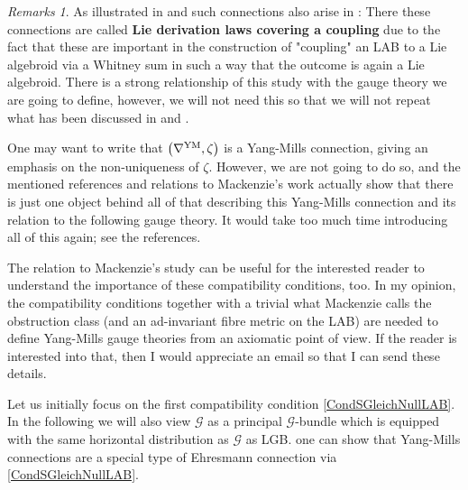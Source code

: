 \documentclass[a4paper,oneside,11pt,bibliography=totoc]{scrartcl}
\theoremstyle{plain}
\theoremstyle{remark}
\newtheorem{remark}[theorem]{Remarks}
\theoremstyle{definition}
\begin{document}
\begin{remark}\label{MackenziesStuffRelation}
\leavevmode\newline
As illustrated in \cite[\S 5.1]{MyThesis} and \cite{My1stpaper} such connections also arise in \cite[\S 7.2, page 271ff.]{mackenzieGeneralTheory}: There these connections are called \textbf{Lie derivation laws covering a coupling} due to the fact that these are important in the construction of "coupling" an LAB to a Lie algebroid via a Whitney sum in such a way that the outcome is again a Lie algebroid. There is a strong relationship of this study with the gauge theory we are going to define, however, we will not need this so that we will not repeat what has been discussed in \cite[\S 5.1]{MyThesis} and \cite{My1stpaper}. 

One may want to write that $\mleft( \nabla^{\mathrm{YM}}, \zeta \mright)$ is a Yang-Mills connection, giving an emphasis on the non-uniqueness of $\zeta$. However, we are not going to do so, and the mentioned references and relations to Mackenzie's work actually show that there is just one object behind all of that describing this Yang-Mills connection and its relation to the following gauge theory. It would take too much time introducing all of this again; see the references.

The relation to Mackenzie's study can be useful for the interested reader to understand the importance of these compatibility conditions, too. In my opinion, the compatibility conditions together with a trivial what Mackenzie calls the obstruction class (and an ad-invariant fibre metric on the LAB) are needed to define Yang-Mills gauge theories from an axiomatic point of view. If the reader is interested into that, then I would appreciate an email so that I can send these details.
\end{remark}

Let us initially focus on the first compatibility condition \eqref{CondSGleichNullLAB}. In the following we will also view $\mathcal{G}$ as a principal $\mathcal{G}$-bundle which is equipped with the same horizontal distribution as $\mathcal{G}$ as LGB.  one can show that Yang-Mills connections are a special type of Ehresmann connection via \eqref{CondSGleichNullLAB}.
\end{document}
